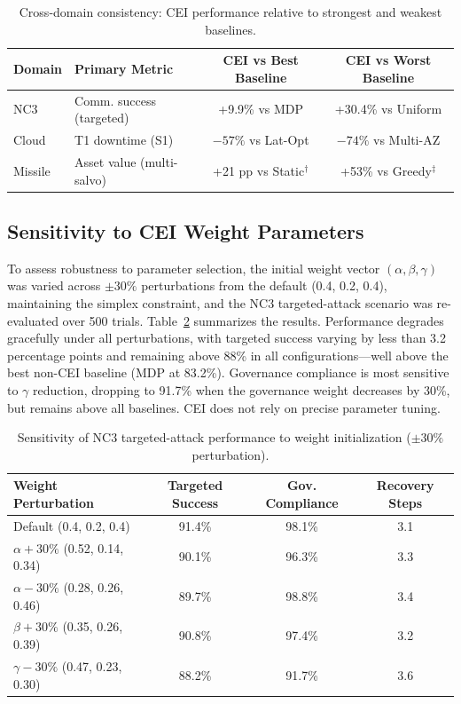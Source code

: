 \documentclass[runningheads]{llncs}
\begin{document}
\begin{table}[ht]
\caption{Cross-domain consistency: CEI performance relative to strongest and weakest baselines.}
\label{tab:cross7}
\centering
\small
\begin{tabular}{lp{4cm}cc}
\toprule
Domain & Primary Metric & CEI vs Best Baseline & CEI vs Worst Baseline \\
\midrule
NC3     & Comm. success (targeted) & +9.9\% vs MDP        & +30.4\% vs Uniform \\
Cloud   & T1 downtime (S1)         & $-57\%$ vs Lat-Opt   & $-74\%$ vs Multi-AZ \\
Missile & Asset value (multi-salvo)& +21 pp vs Static$^\dagger$  & +53\% vs Greedy$^\ddagger$ \\
\bottomrule
\end{tabular}
\end{table}

\subsection{Sensitivity to CEI Weight Parameters}

To assess robustness to parameter selection, the initial weight vector $(\alpha, \beta, \gamma)$ was varied across $\pm 30\%$ perturbations from the default (0.4, 0.2, 0.4), maintaining the simplex constraint, and the NC3 targeted-attack scenario was re-evaluated over 500 trials. Table~\ref{tab:sens} summarizes the results. Performance degrades gracefully under all perturbations, with targeted success varying by less than 3.2 percentage points and remaining above 88\% in all configurations---well above the best non-CEI baseline (MDP at 83.2\%). Governance compliance is most sensitive to $\gamma$ reduction, dropping to 91.7\% when the governance weight decreases by 30\%, but remains above all baselines. CEI does not rely on precise parameter tuning.

\begin{table}[ht]
\caption{Sensitivity of NC3 targeted-attack performance to weight initialization ($\pm 30\%$ perturbation).}
\label{tab:sens}
\centering
\small
\begin{tabular}{lccc}
\toprule
Weight Perturbation & Targeted Success & Gov. Compliance & Recovery Steps \\
\midrule
Default (0.4, 0.2, 0.4)        & 91.4\% & 98.1\% & 3.1 \\
$\alpha +30\%$ (0.52, 0.14, 0.34) & 90.1\% & 96.3\% & 3.3 \\
$\alpha -30\%$ (0.28, 0.26, 0.46) & 89.7\% & 98.8\% & 3.4 \\
$\beta +30\%$ (0.35, 0.26, 0.39)  & 90.8\% & 97.4\% & 3.2 \\
$\gamma -30\%$ (0.47, 0.23, 0.30) & 88.2\% & 91.7\% & 3.6 \\
\bottomrule
\end{tabular}
\end{table}
\end{document}
